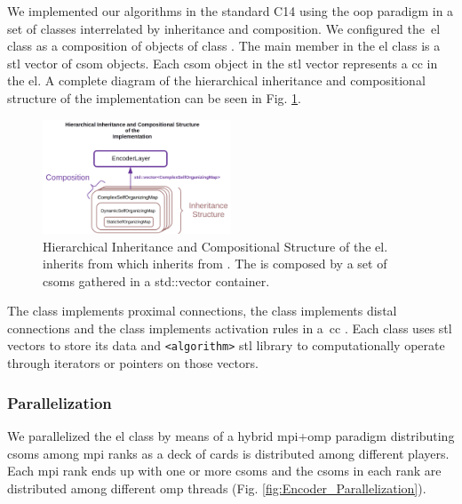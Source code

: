 \documentclass[10pt,journal,compsoc]{IEEEtran}
\newcommand{\CC}{C\nolinebreak\hspace{-.05em}\raisebox{.4ex}{\tiny\bf +}\nolinebreak\hspace{-.10em}\raisebox{.4ex}{\tiny\bf +}}
\begin{document}
We implemented our algorithms in the standard \CC14 using the \gls{oop} paradigm in a set of classes interrelated by inheritance and composition. We configured the~\gls{el} class as a composition of objects of class . The main member in the \gls{el} class is a \gls{stl} vector of \gls{csom} objects. Each \gls{csom} object in the \gls{stl} vector represents a \gls{cc} in the \gls{el}. A complete diagram of the hierarchical inheritance and compositional structure of the implementation can be seen in Fig. \ref{fig:InheritanceComposition}.

\begin{figure}[h!]
    \centering
    \includegraphics[width=0.5\textwidth]{InheritanceComposition.png}
    \caption{Hierarchical Inheritance and Compositional Structure of the \gls{el}.  inherits from  which inherits from . The  is composed by a set of \glspl{csom} gathered    in a std::vector  container.}
    \label{fig:InheritanceComposition}
\end{figure}

The  class implements proximal connections, the  class implements distal connections and the  class implements activation rules in a~\gls{cc} \cite{Dematties2018}. Each class uses \gls{stl} vectors to store its data and \texttt{<algorithm>} \gls{stl} library to computationally operate through iterators or pointers on those vectors.










\subsubsection{ Parallelization}
\label{EL_Parallelization}

We parallelized the \gls{el} class by means of a hybrid \gls{mpi}+\gls{omp} paradigm distributing \glspl{csom} among \gls{mpi} ranks as a deck of cards is distributed among different players. Each \gls{mpi} rank ends up with one or more \glspl{csom} and the \glspl{csom} in each rank are distributed among different \gls{omp} threads (Fig. \ref{fig:Encoder_Parallelization}).%
\end{document}
